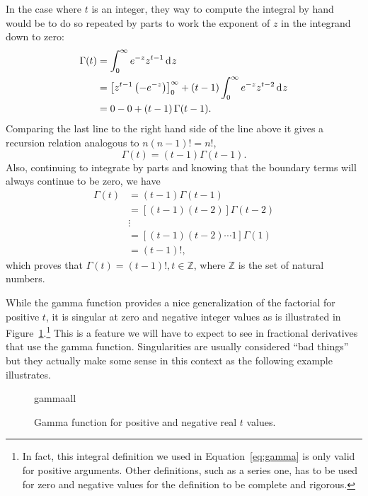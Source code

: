 In the case where $t$ is an integer, they way to compute the integral by hand would be to do so repeated by parts to work the exponent of $z$ in the integrand down to zero:
\begin{align*}
  \Gamma(t) &= 
  \int_0^\infty e^{-z} z^{t-1} \operatorname{d}\hspace*{-1pt} z \\ &= \left[ z^{t-1} \left(- e^{-z} \right) \right]^\infty_0 + \left(t-1 \right) \int_0^\infty e^{-z} z^{t-2} \operatorname{d}\hspace*{-1pt} z \\
  &= 0 - 0 + \left( t - 1 \right) \Gamma(t-1).
\end{align*}
Comparing the last line to the right hand side of the line above it gives a recursion relation analogous to $n \left(n - 1 \right)! = n!$, 
\begin{equation}
  \boxed{ \Gamma(t) = \left( t - 1 \right) \Gamma(t - 1). }
  \label{eq:gammarecursion}
\end{equation}
Also, continuing to integrate by parts and knowing that the boundary terms will always continue to be zero, we have
\begin{align*}
  \Gamma(t) &= \left( t - 1 \right) \Gamma \left( t - 1 \right) \\
  &= \left[ \left( t - 1 \right) \left( t - 2 \right) \right] \Gamma \left( t - 2 \right) \\
  & \vdots \\
  &= \left[ \left(t - 1 \right) \left( t - 2 \right) \cdots 1 \right] \Gamma(1) \\
  &= \left( t - 1 \right)!,
\end{align*}
which proves that $\boxed{ \Gamma(t) = (t-1)!, t \in \mathbb Z }$, where $\mathbb Z$ is the set of natural numbers.

While the gamma function provides a nice generalization of the factorial for positive $t$, it is singular at zero and negative integer values as is illustrated in Figure~\ref{fig:gammaall}.\footnote{In fact, this integral definition we used in Equation~\ref{eq:gamma} is only valid for positive arguments. Other definitions, such as a series one, has to be used for zero and negative values for the definition to be complete and rigorous.} This is a feature we will have to expect to see in fractional derivatives that use the gamma function. Singularities are usually considered ``bad things'' but they actually make some sense in this context as the following example illustrates.

\begin{figure}
  \centering
  {gammaall}
  \caption{Gamma function for positive and negative real $t$ values.}
  \label{fig:gammaall}
\end{figure}

